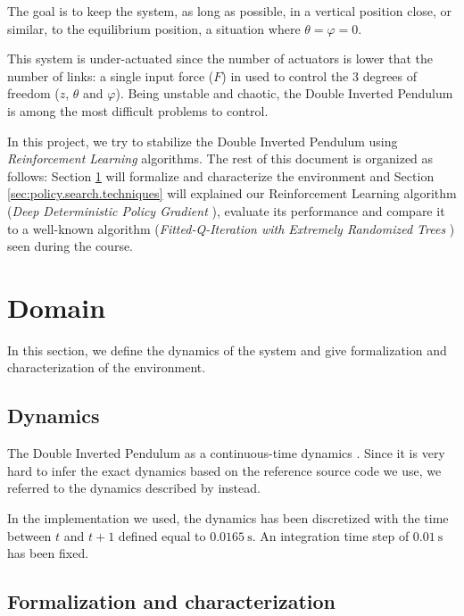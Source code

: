 \documentclass[a4paper, 12pt]{article}
\begin{document}
    The goal is to keep the system, as long as possible, in a vertical position close, or similar, to the equilibrium position, \ie{} a situation where $\theta = \varphi = 0$.
    
    This system is under-actuated since the number of actuators is lower that the number of links: a single input force ($F$) in used to control the 3 degrees of freedom ($z$, $\theta$ and $\varphi$). Being unstable and chaotic, the Double Inverted Pendulum is among the most difficult problems to control. \cite{jadlovska2012classical, zhang2007fault}
    
    In this project, we try to stabilize the Double Inverted Pendulum using \emph{Reinforcement Learning} algorithms. The rest of this document is organized as follows: Section \ref{sec:domain} will formalize and characterize the environment and Section \ref{sec:policy.search.techniques} will explained our Reinforcement Learning algorithm (\emph{Deep Deterministic Policy Gradient} \cite{silver2014deterministic, lillicrap2015continuous}), evaluate its performance and compare it to a well-known algorithm (\emph{Fitted-Q-Iteration with Extremely Randomized Trees} \cite{ernst2005tree}) seen during the course.
    
    \newpage
    
    \section{Domain}\label{sec:domain}
    
    In this section, we define the dynamics of the system and give formalization and characterization of the environment.
    
    \subsection{Dynamics}
    
    The Double Inverted Pendulum as a continuous-time dynamics \cite{ernst2005tree}. Since it is very hard to infer the exact dynamics based on the reference source code we use, we referred to the dynamics described by \textcite{bogdanov2004optimal} instead.
    
    In the implementation we used, the dynamics has been discretized with the time between $t$ and $t + 1$ defined equal to $\SI{0.0165}{\second}$. An integration time step of $\SI{0.01}{\second}$ has been fixed.
    
    \subsection{Formalization and characterization}
    
\end{document}
